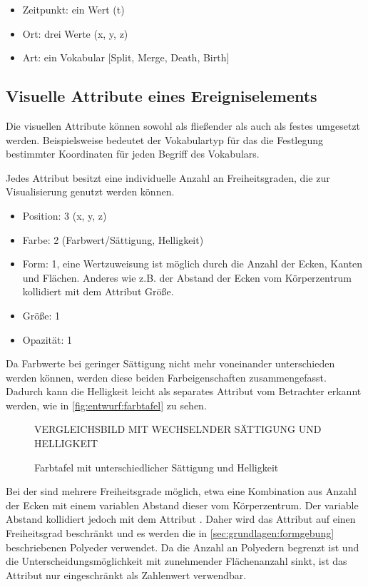 \begin{itemize}
	\item Zeitpunkt: ein Wert (t)
	\item Ort: drei Werte (x, y, z)
	\item Art: ein Vokabular [Split, Merge, Death, Birth]
\end{itemize}

\subsection{Visuelle Attribute eines Ereigniselements}\label{sec:attribute}
Die visuellen Attribute können sowohl als fließender  als auch als festes  umgesetzt werden. Beispielsweise bedeutet der Vokabulartyp für das  die Festlegung bestimmter Koordinaten für jeden Begriff des Vokabulars.

Jedes Attribut besitzt eine individuelle Anzahl an Freiheitsgraden, die zur Visualisierung genutzt werden können.

\begin{itemize}
	\item Position: 3 (x, y, z)
	\item Farbe: 2 (Farbwert/Sättigung, Helligkeit)
	\item Form: 1, eine Wertzuweisung ist möglich durch die Anzahl der Ecken, Kanten und Flächen. Anderes wie z.B. der Abstand der Ecken vom Körperzentrum kollidiert mit dem Attribut Größe.
	\item Größe: 1
	\item Opazität: 1
\end{itemize}

Da Farbwerte bei geringer Sättigung nicht mehr voneinander unterschieden werden können, werden diese beiden Farbeigenschaften zusammengefasst. Dadurch kann die Helligkeit leicht als separates Attribut vom Betrachter erkannt werden, wie in \autoref{fig:entwurf:farbtafel} zu sehen.

\begin{figure}
	VERGLEICHSBILD MIT WECHSELNDER SÄTTIGUNG UND HELLIGKEIT
	\caption{Farbtafel mit unterschiedlicher Sättigung und Helligkeit}\label{fig:entwurf:farbtafel}
\end{figure}

Bei der  sind mehrere Freiheitsgrade möglich, etwa eine Kombination aus Anzahl der Ecken mit einem variablen Abstand dieser vom Körperzentrum. Der variable Abstand kollidiert jedoch mit dem Attribut . Daher wird das Attribut  auf einen Freiheitsgrad beschränkt und es werden die in \autoref{sec:grundlagen:formgebung} beschriebenen Polyeder verwendet. Da die Anzahl an Polyedern begrenzt ist und die Unterscheidungsmöglichkeit mit zunehmender Flächenanzahl sinkt, ist das Attribut  nur eingeschränkt als Zahlenwert verwendbar.

